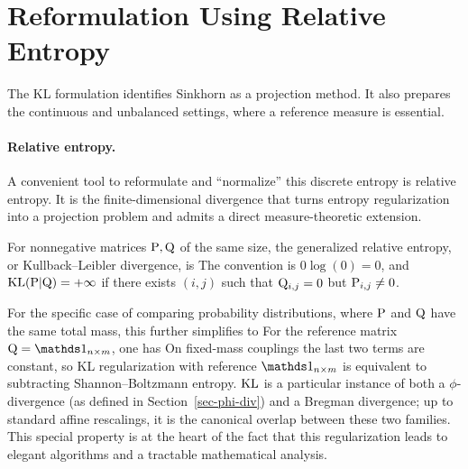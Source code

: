 \section{Reformulation Using Relative Entropy}

The KL formulation identifies Sinkhorn as a projection method. It also prepares the continuous and unbalanced settings, where a reference measure is essential.

\paragraph{Relative entropy.}
A convenient tool to reformulate and ``normalize'' this discrete entropy is relative entropy. It is the finite-dimensional divergence that turns entropy regularization into a projection problem and admits a direct measure-theoretic extension.

\begin{defn}\label{def-discrete-relative-entropy}
	For nonnegative matrices $\P,\Q$ of the same size, the generalized relative entropy, or Kullback--Leibler divergence, is
	The convention is $0\log(0)=0$, and $\KLD(\P|\Q)=+\infty$ if there exists $(i,j)$ such that $\Q_{i,j}=0$ but $\P_{i,j} \neq 0$.
\end{defn}
For the specific case of comparing probability distributions, where $\P$ and $\Q$ have the same total mass, this further simplifies to
For the reference matrix $\Q=\ones_{n \times m}$, one has
On fixed-mass couplings the last two terms are constant, so KL regularization with reference $\ones_{n\times m}$ is equivalent to subtracting Shannon--Boltzmann entropy.
$\KLD$ is a particular instance of both a $\phi$-divergence (as defined in Section~\ref{sec-phi-div}) and a Bregman divergence; up to standard affine rescalings, it is the canonical overlap between these two families. This special property is at the heart of the fact that this regularization leads to elegant algorithms and a tractable mathematical analysis.

